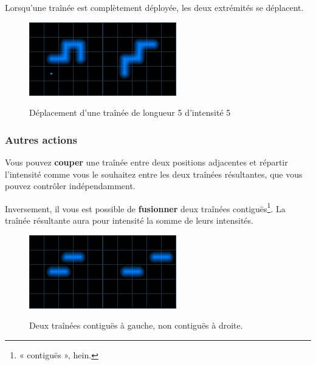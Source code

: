 \newpage

Lorsqu'une traînée est complètement déployée, les deux extrémités se déplacent.

\begin{figure}[h]
\centering
\includegraphics{deplacement3.png}\hspace{5mm}\includegraphics{deplacement4.png}
\caption{Déplacement d'une traînée de longueur 5 d'intensité 5}
\end{figure}

\subsubsection{Autres actions}

Vous pouvez \textbf{couper} une traînée entre deux positions adjacentes et répartir l'intensité comme vous le souhaitez entre les deux traînées résultantes, que vous pouvez contrôler indépendamment.

Inversement, il vous est possible de \textbf{fusionner} deux traînées contiguës\footnote{« contiguës », hein.}. La traînée résultante aura pour intensité la somme de leurs intensités.

\begin{figure}[h]
\centering
\includegraphics{contigues.png}\hspace{5mm}\includegraphics{noncontigues.png}
\caption{Deux traînées contiguës à gauche, non contiguës à droite.}
\end{figure}

